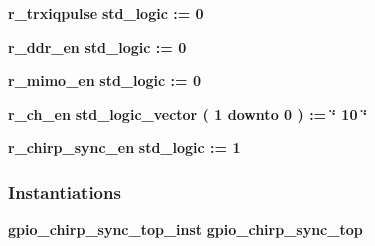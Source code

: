 \begin{DoxyCompactItemize}
\item 
{\bf r\+\_\+trxiqpulse} {\bfseries \textcolor{comment}{std\+\_\+logic}\textcolor{vhdlchar}{ }\textcolor{vhdlchar}{ }\textcolor{vhdlchar}{\+:}\textcolor{vhdlchar}{=}\textcolor{vhdlchar}{ }\textcolor{vhdlchar}{ }\textcolor{vhdlchar}{\textquotesingle{}}\textcolor{vhdlchar}{ } \textcolor{vhdldigit}{0} \textcolor{vhdlchar}{ }\textcolor{vhdlchar}{\textquotesingle{}}\textcolor{vhdlchar}{ }} 
\item 
{\bf r\+\_\+ddr\+\_\+en} {\bfseries \textcolor{comment}{std\+\_\+logic}\textcolor{vhdlchar}{ }\textcolor{vhdlchar}{ }\textcolor{vhdlchar}{\+:}\textcolor{vhdlchar}{=}\textcolor{vhdlchar}{ }\textcolor{vhdlchar}{ }\textcolor{vhdlchar}{\textquotesingle{}}\textcolor{vhdlchar}{ } \textcolor{vhdldigit}{0} \textcolor{vhdlchar}{ }\textcolor{vhdlchar}{\textquotesingle{}}\textcolor{vhdlchar}{ }} 
\item 
{\bf r\+\_\+mimo\+\_\+en} {\bfseries \textcolor{comment}{std\+\_\+logic}\textcolor{vhdlchar}{ }\textcolor{vhdlchar}{ }\textcolor{vhdlchar}{\+:}\textcolor{vhdlchar}{=}\textcolor{vhdlchar}{ }\textcolor{vhdlchar}{ }\textcolor{vhdlchar}{\textquotesingle{}}\textcolor{vhdlchar}{ } \textcolor{vhdldigit}{0} \textcolor{vhdlchar}{ }\textcolor{vhdlchar}{\textquotesingle{}}\textcolor{vhdlchar}{ }} 
\item 
{\bf r\+\_\+ch\+\_\+en} {\bfseries \textcolor{comment}{std\+\_\+logic\+\_\+vector}\textcolor{vhdlchar}{ }\textcolor{vhdlchar}{(}\textcolor{vhdlchar}{ }\textcolor{vhdlchar}{ } \textcolor{vhdldigit}{1} \textcolor{vhdlchar}{ }\textcolor{keywordflow}{downto}\textcolor{vhdlchar}{ }\textcolor{vhdlchar}{ } \textcolor{vhdldigit}{0} \textcolor{vhdlchar}{ }\textcolor{vhdlchar}{)}\textcolor{vhdlchar}{ }\textcolor{vhdlchar}{ }\textcolor{vhdlchar}{ }\textcolor{vhdlchar}{\+:}\textcolor{vhdlchar}{=}\textcolor{vhdlchar}{ }\textcolor{vhdlchar}{ }\textcolor{vhdlchar}{ }\textcolor{vhdlchar}{ }\textcolor{keyword}{\char`\"{} 10 \char`\"{}}\textcolor{vhdlchar}{ }} 
\item 
{\bf r\+\_\+chirp\+\_\+sync\+\_\+en} {\bfseries \textcolor{comment}{std\+\_\+logic}\textcolor{vhdlchar}{ }\textcolor{vhdlchar}{ }\textcolor{vhdlchar}{\+:}\textcolor{vhdlchar}{=}\textcolor{vhdlchar}{ }\textcolor{vhdlchar}{ }\textcolor{vhdlchar}{\textquotesingle{}}\textcolor{vhdlchar}{ } \textcolor{vhdldigit}{1} \textcolor{vhdlchar}{ }\textcolor{vhdlchar}{\textquotesingle{}}\textcolor{vhdlchar}{ }} 
\end{DoxyCompactItemize}
\subsubsection*{Instantiations}
 \begin{DoxyCompactItemize}
\item 
{\bf gpio\+\_\+chirp\+\_\+sync\+\_\+top\+\_\+inst}  {\bfseries gpio\+\_\+chirp\+\_\+sync\+\_\+top}   
\end{DoxyCompactItemize}


